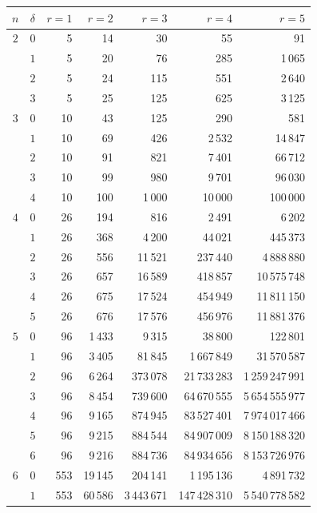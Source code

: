 \documentclass[11pt, a4paper, abstract=yes]{scrartcl}
\theoremstyle{definition}
\theoremstyle{remark}
\theoremstyle{plain}
\begin{document}
\begingroup\footnotesize
\begin{center}
\begin{tabular}{@{}ccrrrrr@{}}
\toprule
\(n\) & \(\delta\) & \(r=1\) & \(r=2\) & \(r=3\) & \(r=4\) & \(r=5\)\\
\midrule
\(2\) & \(0\) & 5 & 14 & 30 & 55 & 91\\
 & \(1\) & 5 & 20 & 76 & 285 & 1\,065\\
 & \(2\) & 5 & 24 & 115 & 551 & 2\,640\\
 & \(3\) & 5 & 25 & 125 & 625 & 3\,125\\
\addlinespace
\(3\) & \(0\) & 10 & 43 & 125 & 290 & 581\\
 & \(1\) & 10 & 69 & 426 & 2\,532 & 14\,847\\
 & \(2\) & 10 & 91 & 821 & 7\,401 & 66\,712\\
 & \(3\) & 10 & 99 & 980 & 9\,701 & 96\,030\\
 & \(4\) & 10 & 100 & 1\,000 & 10\,000 & 100\,000\\
\addlinespace
\(4\) & \(0\) & 26 & 194 & 816 & 2\,491 & 6\,202\\
 & \(1\) & 26 & 368 & 4\,200 & 44\,021 & 445\,373\\
 & \(2\) & 26 & 556 & 11\,521 & 237\,440 & 4\,888\,880\\
 & \(3\) & 26 & 657 & 16\,589 & 418\,857 & 10\,575\,748\\
 & \(4\) & 26 & 675 & 17\,524 & 454\,949 & 11\,811\,150\\
 & \(5\) & 26 & 676 & 17\,576 & 456\,976 & 11\,881\,376\\
\addlinespace
\(5\) & \(0\) & 96 & 1\,433 & 9\,315 & 38\,800 & 122\,801\\
 & \(1\) & 96 & 3\,405 & 81\,845 & 1\,667\,849 & 31\,570\,587\\
 & \(2\) & 96 & 6\,264 & 373\,078 & 21\,733\,283 & 1\,259\,247\,991\\
 & \(3\) & 96 & 8\,454 & 739\,600 & 64\,670\,555 & 5\,654\,555\,977\\
 & \(4\) & 96 & 9\,165 & 874\,945 & 83\,527\,401 & 7\,974\,017\,466\\
 & \(5\) & 96 & 9\,215 & 884\,544 & 84\,907\,009 & 8\,150\,188\,320\\
 & \(6\) & 96 & 9\,216 & 884\,736 & 84\,934\,656 & 8\,153\,726\,976\\
\addlinespace
\(6\) & \(0\) & 553 & 19\,145 & 204\,141 & 1\,195\,136 & 4\,891\,732\\
 & \(1\) & 553 & 60\,586 & 3\,443\,671 & 147\,428\,310 & 5\,540\,778\,582\\

\end{tabular}
\end{center}
\end{document}
